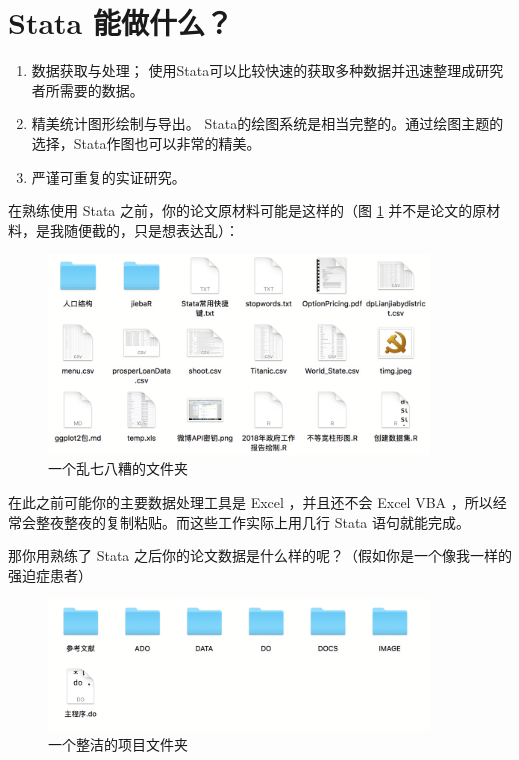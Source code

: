 \documentclass[]{ctexbook}
\providecommand{\tightlist}{%
  \setlength{\itemsep}{0pt}\setlength{\parskip}{0pt}}
\begin{document}
\hypertarget{stata--3}{%
\section{Stata 能做什么？}\label{stata--3}}

\begin{enumerate}
\def\labelenumi{\arabic{enumi}.}
\tightlist
\item
  数据获取与处理；
  使用Stata可以比较快速的获取多种数据并迅速整理成研究者所需要的数据。
\item
  精美统计图形绘制与导出。
  Stata的绘图系统是相当完整的。通过绘图主题的选择，Stata作图也可以非常的精美。
\item
  严谨可重复的实证研究。
\end{enumerate}

在熟练使用 Stata 之前，你的论文原材料可能是这样的（图 \ref{fig:dirtydir} 并不是论文的原材料，是我随便截的，只是想表达乱）：

\begin{figure}

{\centering \includegraphics[width=0.9\textwidth]{assets/dirtydir} 

}

\caption{一个乱七八糟的文件夹}\label{fig:dirtydir}
\end{figure}

在此之前可能你的主要数据处理工具是 Excel ，并且还不会 Excel VBA ，所以经常会整夜整夜的复制粘贴。而这些工作实际上用几行 Stata 语句就能完成。

那你用熟练了 Stata 之后你的论文数据是什么样的呢？（假如你是一个像我一样的强迫症患者）

\begin{figure}

{\centering \includegraphics[width=0.9\textwidth]{assets/cleandir} 

}

\caption{一个整洁的项目文件夹}\label{fig:cleandir}
\end{figure}
\end{document}

